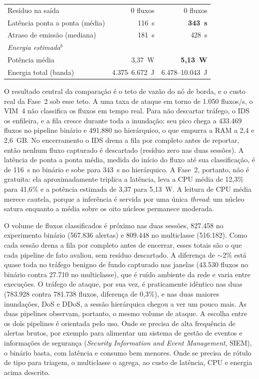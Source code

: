 \documentclass[12pt]{article}
\begin{document}
\begin{table}[ht]
\begin{tabular}{@{}lrr@{}}
\quad Resíduo na saída  & 0 fluxos & 0 fluxos \\
\quad Latência ponta a ponta (média) & 116~s & \textbf{343~s} \\
\quad Atraso de emissão (mediana) & 181~s & 428~s \\ \midrule
\multicolumn{3}{l}{\textit{Energia estimada$^{b}$}} \\
\quad Potência média & 3,37~W & \textbf{5,13~W} \\
\quad Energia total (banda)   & 4.375--6.672~J & 6.478--10.043~J \\
\bottomrule
\end{tabular}
\end{table}





O resultado central da comparação é o teto de vazão do nó de borda, e o custo
real da Fase~2 sob esse teto. A uma taxa de ataque em torno de 1.050 fluxos/s, o
VIM~4 não classifica os fluxos em tempo real. Para não descartar tráfego, o IDS
os enfileira, e a fila cresce durante toda a inundação: seu pico chega a 433.469
fluxos no pipeline binário e 491.880 no hierárquico, o que empurra a RAM a 2,4 e
2,6~GB. No encerramento o IDS drena a fila por completo antes de reportar, então
nenhum fluxo capturado é descartado (resíduo zero nas duas sessões). A latência de
ponta a ponta média, medida do início do fluxo até sua classificação, é de 116~s
no binário e sobe para 343~s no hierárquico. A Fase~2, portanto, não é gratuita:
ela aproximadamente triplica a latência, leva a CPU média de 12,3\% para 41,6\% e a
potência estimada de 3,37 para 5,13~W. A leitura
de CPU média merece cautela, porque a inferência é servida por uma única
\textit{thread}: um núcleo satura enquanto a média sobre os oito núcleos
permanece moderada.

O volume de fluxos classificados é próximo nas duas sessões, 827.458 no
experimento binário (567.836 alertas) e 809.448 no multiclasse (516.182). Como
cada sessão drena a fila por completo antes de encerrar, esses totais são o que
cada pipeline de fato avaliou, sem resíduo descartado. A diferença de $\sim$2\%
está quase toda no tráfego benigno de fundo capturado nas janelas (43.530 fluxos
no binário contra 27.710 no multiclasse), que é ruído ambiente da rede e varia
entre execuções. O tráfego de ataque, por sua vez, é praticamente idêntico nas
duas (783.928 contra 781.738 fluxos, diferença de 0,3\%), e nas duas maiores
inundações, DoS e DDoS, a sessão hierárquica chegou a ver um pouco mais. As duas
pipelines observam, portanto, o mesmo volume de ataque. A escolha
entre os dois pipelines é orientada pelo uso. Onde se precisa de alta frequência
de alertas brutos, por exemplo para alimentar um sistema de gestão de eventos e
informações de segurança (\textit{Security Information and Event Management},
SIEM), o binário basta, com latência e consumo bem menores. Onde se precisa de
rótulo de tipo para triagem, o multiclasse o agrega, ao custo de latência, CPU e
energia acima descrito.
\end{document}
